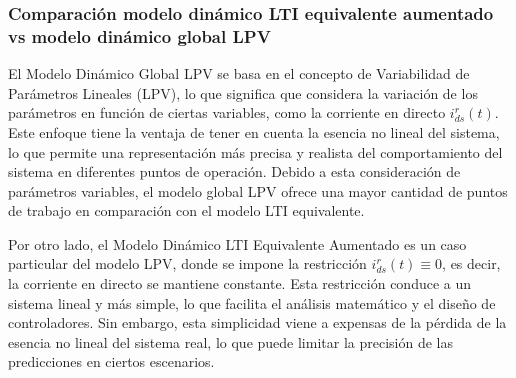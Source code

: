 \documentclass{article}
\begin{document}

\subsubsection{Comparación modelo dinámico LTI equivalente aumentado vs modelo dinámico global LPV}

El Modelo Dinámico Global LPV se basa en el concepto de Variabilidad de Parámetros Lineales (LPV), 
lo que significa que considera la variación de los parámetros en función de ciertas variables, como 
la corriente en directo $i^r_{ds}(t)$. Este enfoque tiene la ventaja de tener en cuenta la esencia no 
lineal del sistema, lo que permite una representación más precisa y realista del comportamiento del 
sistema en diferentes puntos de operación. Debido a esta consideración de parámetros variables, el 
modelo global LPV ofrece una mayor cantidad de puntos de trabajo en comparación con el modelo LTI 
equivalente.

Por otro lado, el Modelo Dinámico LTI Equivalente Aumentado es un caso particular del modelo LPV, 
donde se impone la restricción $i^r_{ds}(t) \equiv 0$, es decir, la corriente en directo se mantiene 
constante. Esta restricción conduce a un sistema lineal y más simple, lo que facilita el análisis 
matemático y el diseño de controladores. Sin embargo, esta simplicidad viene a expensas de la pérdida 
de la esencia no lineal del sistema real, lo que puede limitar la precisión de las predicciones en 
ciertos escenarios.
\end{document}
